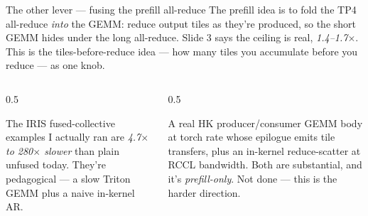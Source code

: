 \documentclass[pdf,aspectratio=169]{beamer}
\newcommand{\empy}[1]{{\color{darkorange}\emph{#1}}}
\newcommand{\empr}[1]{{\color{cardinalred}\emph{#1}}}
\newcommand{\examplebox}[2]{%
\begin{tcolorbox}[colframe=darkcardinal,colback=boxgray,title={#1}]
#2
\end{tcolorbox}}
\begin{document}
\begin{frame}{The other lever --- fusing the prefill all-reduce}
\small
The prefill idea is to fold the TP4 all-reduce \empy{into} the GEMM: reduce output tiles as they're produced, so the short GEMM hides under the long all-reduce. Slide 3 says the ceiling is real, \empy{1.4--1.7$\times$}. This is the tiles-before-reduce idea --- how many tiles you accumulate before you reduce --- as one knob.
\vspace{0.5ex}
\begin{columns}
\begin{column}{0.5\textwidth}
\examplebox{Honest status: the substrate isn't ready}{\small
The IRIS fused-collective examples I actually ran are \empr{4.7$\times$ to 280$\times$ slower} than plain unfused today. They're pedagogical --- a slow Triton GEMM plus a naive in-kernel AR.}
\end{column}
\begin{column}{0.5\textwidth}
\examplebox{What it would take}{\small
A real HK producer/consumer GEMM body at torch rate whose epilogue emits tile transfers, plus an in-kernel reduce-scatter at RCCL bandwidth. Both are substantial, and it's \empr{prefill-only}. Not done --- this is the harder direction.}
\end{column}
\end{columns}
\end{frame}
\end{document}
